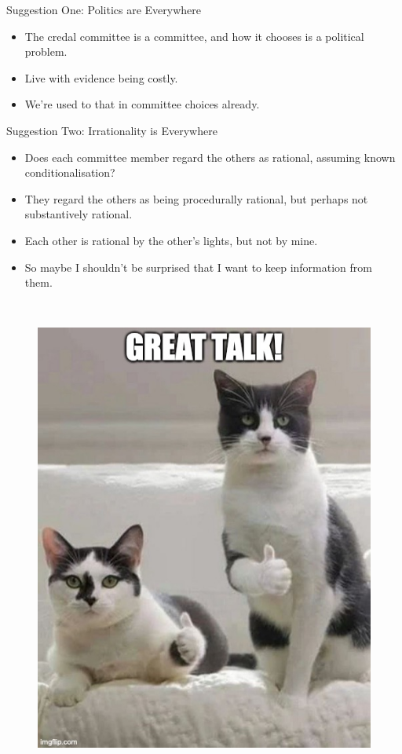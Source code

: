 \documentclass[
  ignorenonframetext,
]{beamer}
\providecommand{\tightlist}{%
  \setlength{\itemsep}{0pt}\setlength{\parskip}{0pt}}
\begin{document}
\begin{frame}{Suggestion One: Politics are Everywhere}
\protect\hypertarget{suggestion-one-politics-are-everywhere}{}
\begin{itemize}
\tightlist
\item
  The credal committee is a committee, and how it chooses is a political
  problem.
\item
  Live with evidence being costly.
\item
  We're used to that in committee choices already.
\end{itemize}
\end{frame}

\begin{frame}{Suggestion Two: Irrationality is Everywhere}
\protect\hypertarget{suggestion-two-irrationality-is-everywhere}{}
\begin{itemize}
\tightlist
\item
  Does each committee member regard the others as rational, assuming
  known conditionalisation?
\item
  They regard the others as being procedurally rational, but perhaps not
  substantively rational.
\item
  Each other is rational by the other's lights, but not by mine.
\item
  So maybe I shouldn't be surprised that I want to keep information from
  them.
\end{itemize}
\end{frame}

\begin{frame}
~

\begin{figure}
\centering
\includegraphics[width=\textwidth,height=0.9\textheight]{thumbs-cats.jpg}
\caption{~}
\end{figure}
\end{frame}
\end{document}
